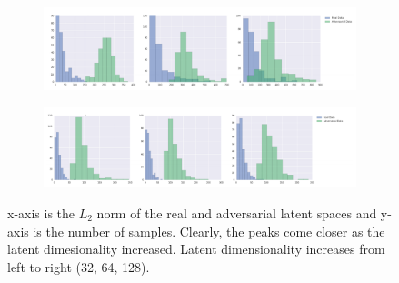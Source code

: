 \documentclass[journal]{IEEEtran}
\begin{document}
\begin{figure}[t]
	\centering
	\captionsetup{justification=centering}

	\begin{subfigure}{\textwidth}
		\centering
		\includegraphics[width=\textwidth]{Images/VAE/MNIST.png}
	\end{subfigure}
	\begin{subfigure}{\textwidth}
		\centering
		\includegraphics[width=\textwidth]{Images/VAE/SVHN.png}
	\end{subfigure}

	\caption{x-axis is the $L_2$ norm of the real and adversarial latent spaces and y-axis is the number of samples. Clearly, the peaks come closer as the latent dimesionality increased. Latent dimensionality increases from left to right (32, 64, 128).}
	
	\label{fig:distance}
\end{figure}
\end{document}
